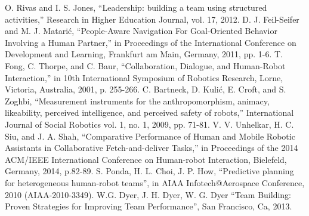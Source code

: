 \documentclass{acm_proc_article-sp}
\begin{document}
\begin{thebibliography}{}
 O. Rivas and I. S. Jones, ``Leadership: building a team using structured activities,'' Research in Higher Education Journal, vol. 17, 2012.
 D. J. Feil-Seifer and M. J. Matari\'{c}, ``People-Aware Navigation For Goal-Oriented Behavior Involving a Human Partner,'' in Proceedings of the International Conference on Development and Learning, Frankfurt am Main, Germany, 2011, pp. 1-6.
 T. Fong, C. Thorpe, and C. Baur, ``Collaboration, Dialogue, and Human-Robot Interaction,'' in 10th International Symposium of Robotics Research, Lorne, Victoria, Australia, 2001, p. 255-266.
 C. Bartneck, D. Kuli\'{c}, E. Croft, and S. Zoghbi, ``Measurement instruments for the anthropomorphism, animacy, likeability, perceived intelligence, and perceived safety of robots,'' International Journal of Social Robotics vol. 1, no. 1, 2009, pp. 71-81.
 V. V. Unhelkar, H. C. Siu, and J. A. Shah, ``Comparative Performance of Human and Mobile Robotic Assistants in Collaborative Fetch-and-deliver Tasks,'' in Proceedings of the 2014 ACM/IEEE International Conference on Human-robot Interaction, Bielefeld, Germany, 2014, p.82-89.
 S. Ponda, H. L. Choi, J. P. How, ``Predictive planning for heterogeneous human-robot teams'', in AIAA Infotech@Aerospace Conference, 2010 (AIAA-2010-3349).
 W.G. Dyer, J. H. Dyer, W. G. Dyer ``Team Building: Proven Strategies for Improving Team Performance'', San Francisco, Ca, 2013.
\end{thebibliography}

\balancecolumns
\end{document}
